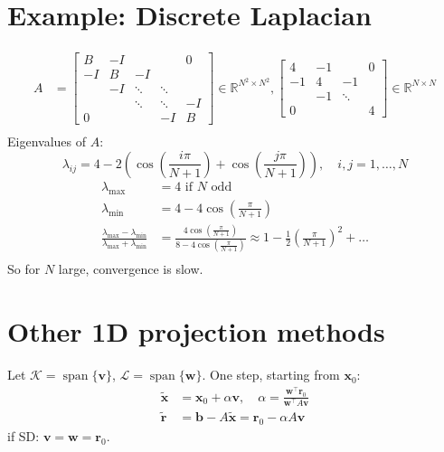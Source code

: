\section*{Example: Discrete Laplacian}
\begin{align*}
    A & =
    \begin{bmatrix}
        B  & -I &        &        & 0  \\
        -I & B  & -I     &        &    \\
           & -I & \ddots & \ddots &    \\
           &    & \ddots & \ddots & -I \\
        0  &    &        & -I     & B
    \end{bmatrix} \in \mathbb{R}^{N^2 \times N^2},
    \begin{bmatrix}
        4  & -1 &        & 0 \\
        -1 & 4  & -1     &   \\
           & -1 & \ddots &   \\
        0  &    &        & 4
    \end{bmatrix} \in \mathbb{R}^{N \times N} \\
\end{align*}
Eigenvalues of $A$:
\[
    \lambda_{ij} = 4 - 2\left(\cos\left(\frac{i \pi}{N+1}\right) + \cos\left(\frac{j \pi}{N+1}\right)\right), \quad i, j = 1, \ldots, N
\]
\begin{align*}
    \lambda_{\max}                                                          & = 4 \text{ if } N \text{ odd}                                                                                                                \\
    \lambda_{\min}                                                          & = 4 - 4\cos\left(\frac{\pi}{N+1}\right)                                                                                                      \\
    \frac{\lambda_{\max} - \lambda_{\min}}{\lambda_{\max} + \lambda_{\min}} & = \frac{4\cos\left(\frac{\pi}{N+1}\right)}{8 - 4\cos\left(\frac{\pi}{N+1}\right)} \approx 1 - \frac12\left(\frac{\pi}{N+1}\right)^2 + \ldots \\
\end{align*}
So for $N$ large, convergence is slow.

\section*{Other 1D projection methods}
Let $\mathcal{K} = \operatorname{span}\{\mathbf{v}\}$, $\mathcal{L} = \operatorname{span}\{\mathbf{w}\}$.
One step, starting from $\mathbf{x}_0$:
\begin{align*}
    \tilde{\mathbf{x}} & = \mathbf{x}_0 + \alpha \mathbf{v}, \quad \alpha = \frac{\mathbf{w}^{\top} \mathbf{r}_0}{\mathbf{w}^{\top} A \mathbf{v}} \\
    \tilde{\mathbf{r}} & = \mathbf{b} - A\tilde{\mathbf{x}} = \mathbf{r}_0 - \alpha A \mathbf{v}
\end{align*}
if SD: $\mathbf{v} = \mathbf{w} = \mathbf{r}_0$.

